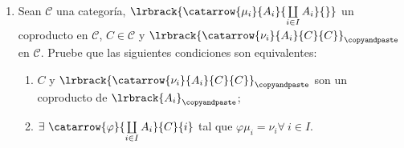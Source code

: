 \documentclass{article}
\begin{document}
\begin{enumerate}[label=\textbf{Ej \arabic*.}]
\begin{proof}
\begin{align*}
\gamma(x)&=\gamma\left(\displaystyle\sum_{k=1}^nx_{i_k}\right)=\displaystyle\sum_{k=1}^n\gamma(x_{i_k})\\
&=\displaystyle\sum_{k=1}^n\gamma\mu_{i_k}(x_{i_k})=\displaystyle\sum_{k=1}^n\beta_{i_k}(x_{i_k})\\
&=\displaystyle\sum_{k=1}^n\beta\mu_{i_k}(x_{i_k})=\displaystyle\sum_{k=1}^n\beta(x_{i_k})\\
&=\beta\displaystyle\sum_{k=1}^n(x_{i_k})=\beta(x).
\end{align*}
Por lo que $\beta$ es única, y así $\displaystyle\sum_{i\in I}A_i$ es un coproducto.
\end{proof}


\item Sean $\mathscr{C}$ una categoría, $\lrbrack{\catarrow{\mu_i}{A_i}{\coprod\limits_{i\in I}A_i}{}}$ un coproducto en $\mathscr{C}$,
$C\in\mathscr{C}$ y $\lrbrack{\catarrow{\nu_i}{A_i}{C}{C}}_{\copyandpaste}$ en $\mathscr{C}$. Pruebe que las siguientes condiciones 
son equivalentes:
\begin{enumerate}[label=\textit{\alph*)}]
	\item $C$ y $\lrbrack{\catarrow{\nu_i}{A_i}{C}{C}}_{\copyandpaste}$ son un coproducto de $\lrbrack{A_i}_{\copyandpaste}$;
	\item $\exists\ \catarrow{\varphi}{\coprod\limits_{i\in I}A_i}{C}{i}$ tal que  $\varphi\mu_i=\nu_i$\quad $\forall\ i\in I$.
\end{enumerate}
\end{enumerate}		
\end{document}
